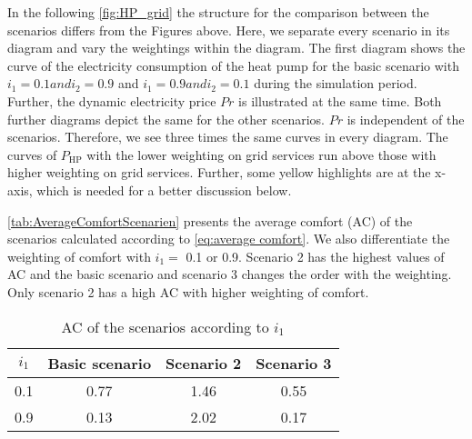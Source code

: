 In the following \autoref{fig:HP_grid} the structure for the comparison between the scenarios differs from the Figures above. Here, we separate every scenario in its diagram and vary the weightings within the diagram. The first diagram shows the curve of the electricity consumption of the heat pump for the basic scenario with $i_\text{1} = 0.1 and i_\text{2} = 0.9$ and $i_\text{1} = 0.9 and i_\text{2} = 0.1$ during the simulation period. Further, the dynamic electricity price $Pr$ is illustrated at the same time. Both further diagrams depict the same for the other scenarios. $Pr$ is independent of the scenarios. Therefore, we see three times the same curves in every diagram. The curves of $P_\text{HP}$ with the lower weighting on grid services run above those with higher weighting on grid services. Further, some yellow highlights are at the x-axis, which is needed for a better discussion below. 
    \begin{figure}[H]
           \centering
        \def\svgwidth{0.9\textwidth}
        
        \caption{}
         \label{fig:HP_grid}
    \end{figure}
    
\autoref{tab:AverageComfortScenarien} presents the average comfort (AC) of the scenarios calculated according to \autoref{eq:average comfort}. We also differentiate the weighting of comfort with $i_\text{1} =$ 0.1 or 0.9. Scenario 2 has the highest values of AC and the basic scenario and scenario 3 changes the order with the weighting. Only scenario 2 has a high AC with higher weighting of comfort.  
    \begin{table}[H]
        \centering
        \begin{tabular}{c||c|c|c}
          $i_\text{1}$  &  Basic scenario & Scenario 2 & Scenario 3\\
          \hline  \hline
             0.1 & 0.77 & 1.46 & 0.55\\
             0.9 & 0.13 & 2.02 & 0.17\\
        \end{tabular}
        \caption{AC of the scenarios according to $i_\text{1}$}
        \label{tab:AverageComfortScenarien}
    \end{table}
    
